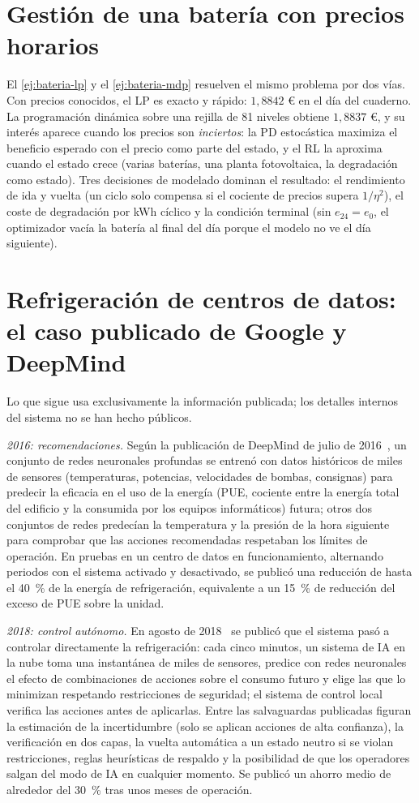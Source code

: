 \section{Gestión de una batería con precios horarios}

El \cref{ej:bateria-lp} y el \cref{ej:bateria-mdp} resuelven el mismo problema por dos vías. Con precios conocidos, el LP es exacto y rápido: $1{,}8842$ € en el día del cuaderno. La programación dinámica sobre una rejilla de 81 niveles obtiene $1{,}8837$ €, y su interés aparece cuando los precios son \emph{inciertos}: la PD estocástica maximiza el beneficio esperado con el precio como parte del estado, y el RL la aproxima cuando el estado crece (varias baterías, una planta fotovoltaica, la degradación como estado). Tres decisiones de modelado dominan el resultado: el rendimiento de ida y vuelta (un ciclo solo compensa si el cociente de precios supera $1/\eta^{2}$), el coste de degradación por kWh cíclico y la condición terminal (sin $e_{24}=e_0$, el optimizador vacía la batería al final del día porque el modelo no ve el día siguiente).

\section{Refrigeración de centros de datos: el caso publicado de Google y DeepMind}

Lo que sigue usa exclusivamente la información publicada; los detalles internos del sistema no se han hecho públicos.

\emph{2016: recomendaciones.} Según la publicación de DeepMind de julio de 2016~\cite{evansgao}, un conjunto de redes neuronales profundas se entrenó con datos históricos de miles de sensores (temperaturas, potencias, velocidades de bombas, consignas) para predecir la eficacia en el uso de la energía (PUE, cociente entre la energía total del edificio y la consumida por los equipos informáticos) futura; otros dos conjuntos de redes predecían la temperatura y la presión de la hora siguiente para comprobar que las acciones recomendadas respetaban los límites de operación. En pruebas en un centro de datos en funcionamiento, alternando periodos con el sistema activado y desactivado, se publicó una reducción de hasta el 40~\% de la energía de refrigeración, equivalente a un 15~\% de reducción del exceso de PUE sobre la unidad.

\emph{2018: control autónomo.} En agosto de 2018~\cite{gamblegao} se publicó que el sistema pasó a controlar directamente la refrigeración: cada cinco minutos, un sistema de IA en la nube toma una instantánea de miles de sensores, predice con redes neuronales el efecto de combinaciones de acciones sobre el consumo futuro y elige las que lo minimizan respetando restricciones de seguridad; el sistema de control local verifica las acciones antes de aplicarlas. Entre las salvaguardas publicadas figuran la estimación de la incertidumbre (solo se aplican acciones de alta confianza), la verificación en dos capas, la vuelta automática a un estado neutro si se violan restricciones, reglas heurísticas de respaldo y la posibilidad de que los operadores salgan del modo de IA en cualquier momento. Se publicó un ahorro medio de alrededor del 30~\% tras unos meses de operación.

